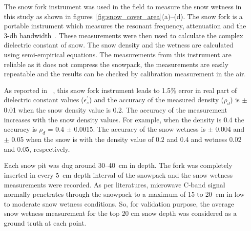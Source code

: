 The snow fork instrument was used in the field to measure the snow wetness in this study as shown in figures~\ref{fig:snow_cover_area}(a)--(d). The snow fork is a portable instrument which measures the resonant frequency, attenuation and the 3-db bandwidth~\citep{sihvola1986snow}. These measurements were then used to calculate the complex dielectric constant of snow. The snow density and the wetness are calculated using semi-empirical equations. The measurements from this instrument are reliable as it does not compress the snowpack, the measurements are easily repeatable and the results can be checked by calibration measurement in the air. 

As reported in ~\cite{sihvola1986snow}, this snow fork instrument leads to 1.5$\%$ error in real part of dielectric constant values ($\epsilon_{s}^{'}$) and the accuracy of the measured density ($\rho_{d}$) is $\pm$ 0.01 when the snow density value is 0.2. The accuracy of the measurement increases with the snow density values. For example, when the density is 0.4 the accuracy is $\rho_{d}$ = 0.4 $\pm$ 0.0015. The accuracy of the snow wetness is $\pm$ 0.004 and $\pm$ 0.05 when the snow is with the density value of 0.2 and 0.4 and wetness 0.02 and 0.05, respectively.

Each snow pit was dug around 30--40~cm in depth. The fork was completely inserted in every 5~cm depth interval of the snowpack and the snow wetness measurements were recorded. As per literatures, microwave C-band signal normally penetrates through the snowpack to a maximum of 15 to 20~cm in low to moderate snow wetness conditions. So, for validation purpose, the average snow wetness measurement for the top 20 cm snow depth was considered as a ground truth at each point.

